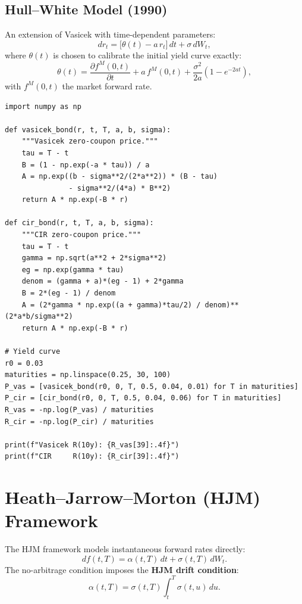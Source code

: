 \subsection{Hull--White Model (1990)}

\begin{definition}
An extension of Vasicek with time-dependent parameters:
\[
    dr_t = \bigl[\theta(t) - a\,r_t\bigr]\,dt + \sigma\,dW_t,
\]
where $\theta(t)$ is chosen to calibrate the initial yield curve exactly:
\[
    \theta(t) = \frac{\partial f^M(0,t)}{\partial t} + a\,f^M(0,t)
    + \frac{\sigma^2}{2a}(1 - e^{-2at}),
\]
with $f^M(0,t)$ the market forward rate.
\end{definition}

\begin{codeblock}[title=\textbf{Vasicek and CIR Models}]
\begin{verbatim}
import numpy as np

def vasicek_bond(r, t, T, a, b, sigma):
    """Vasicek zero-coupon price."""
    tau = T - t
    B = (1 - np.exp(-a * tau)) / a
    A = np.exp((b - sigma**2/(2*a**2)) * (B - tau)
               - sigma**2/(4*a) * B**2)
    return A * np.exp(-B * r)

def cir_bond(r, t, T, a, b, sigma):
    """CIR zero-coupon price."""
    tau = T - t
    gamma = np.sqrt(a**2 + 2*sigma**2)
    eg = np.exp(gamma * tau)
    denom = (gamma + a)*(eg - 1) + 2*gamma
    B = 2*(eg - 1) / denom
    A = (2*gamma * np.exp((a + gamma)*tau/2) / denom)**(2*a*b/sigma**2)
    return A * np.exp(-B * r)

# Yield curve
r0 = 0.03
maturities = np.linspace(0.25, 30, 100)
P_vas = [vasicek_bond(r0, 0, T, 0.5, 0.04, 0.01) for T in maturities]
P_cir = [cir_bond(r0, 0, T, 0.5, 0.04, 0.06) for T in maturities]
R_vas = -np.log(P_vas) / maturities
R_cir = -np.log(P_cir) / maturities

print(f"Vasicek R(10y): {R_vas[39]:.4f}")
print(f"CIR     R(10y): {R_cir[39]:.4f}")
\end{verbatim}
\end{codeblock}

\section{Heath--Jarrow--Morton (HJM) Framework}

\begin{theorem}
The HJM framework models instantaneous forward rates directly:
\[
    df(t,T) = \alpha(t,T)\,dt + \sigma(t,T)\,dW_t.
\]
The no-arbitrage condition imposes the \textbf{HJM drift condition}:
\[
    \alpha(t,T) = \sigma(t,T)\int_t^T \sigma(t,u)\,du.
\]
\end{theorem}

